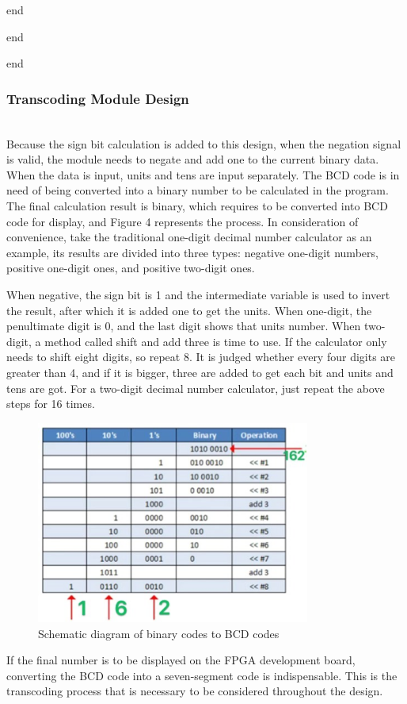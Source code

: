 \documentclass[conference,compsoc]{IEEEtran}
\begin{document}
	\qquad \qquad \qquad end
	
	\qquad \qquad end 
	
	end

\subsubsection{Transcoding Module Design}
\hfill\\

Because the sign bit calculation is added to this design, when the negation signal is valid, the module needs to negate and add one to the current binary data. When the data is input, units and tens are input separately. The BCD code is in need of being converted into a binary number to be calculated in the program. The final calculation result is binary, which requires to be converted into BCD code for display, and Figure 4 represents the process. In consideration of convenience, take the traditional one-digit decimal number calculator as an example, its results are divided into three types: negative one-digit numbers, positive one-digit ones, and positive two-digit ones. 

When negative, the sign bit is 1 and the intermediate variable is used to invert the result, after which it is added one to get the units. When one-digit, the penultimate digit is 0, and the last digit shows that units number. When two-digit, a method called shift and add three is time to use. If the calculator only needs to shift eight digits, so repeat 8. It is judged whether every four digits are greater than 4, and if it is bigger, three are added to get each bit and units and tens are got. For a two-digit decimal number calculator, just repeat the above steps for 16 times. 
\begin{figure}[H]
	\centering
	\includegraphics[width=9cm]{fig5}
	\caption{Schematic diagram of binary codes to BCD codes}
	\label{Fig5}
\end{figure}
If the final number is to be displayed on the FPGA development board, converting the BCD code into a seven-segment code is indispensable. This is the transcoding process that is necessary to be considered throughout the design.
\end{document}
